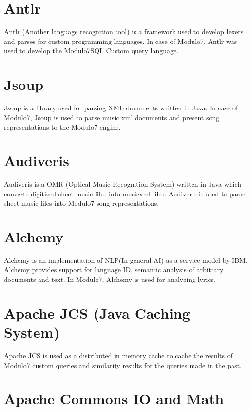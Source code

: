 \section{Antlr}

\noindent Antlr (Another language recognition tool) is a framework used to develop lexers and parses for custom programming languages. In case of Modulo7, Antlr was used to develop the Modulo7SQL Custom query language.

\section{Jsoup}

\noindent Jsoup is a library used for parsing XML documents written in Java. In case of Modulo7, Jsoup is used to parse music xml documents and present song representations to the Modulo7 engine. 

\section{Audiveris}

\noindent Audiveris is a OMR (Optical Music Recognition System) written in Java which converts digitized sheet music files into musicxml files. Audiveris is used to parse sheet music files into Modulo7 song representations.

\section{Alchemy} \label{Alchemy}

\noindent Alchemy is an implementation of NLP(In general AI) as a service model by IBM. Alchemy provides support for language ID, semantic analysis of arbitrary documents and text. In Modulo7, Alchemy is used for analyzing lyrics.  

\section{Apache JCS (Java Caching System)}

\noindent Apache JCS is used as a distributed in memory cache to cache the results of Modulo7 custom queries and similarity results for the queries made in the past. 

\section{Apache Commons IO and Math}

